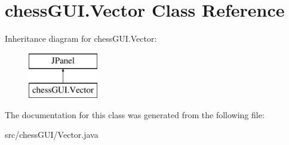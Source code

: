 \hypertarget{classchess_g_u_i_1_1_vector}{}\section{chess\+G\+U\+I.\+Vector Class Reference}
\label{classchess_g_u_i_1_1_vector}
Inheritance diagram for chess\+G\+U\+I.\+Vector\+:\begin{figure}[H]
\begin{center}
\leavevmode
\includegraphics[height=2.000000cm]{classchess_g_u_i_1_1_vector}
\end{center}
\end{figure}


The documentation for this class was generated from the following file\+:\begin{DoxyCompactItemize}
\item 
src/chess\+G\+U\+I/Vector.\+java\end{DoxyCompactItemize}
